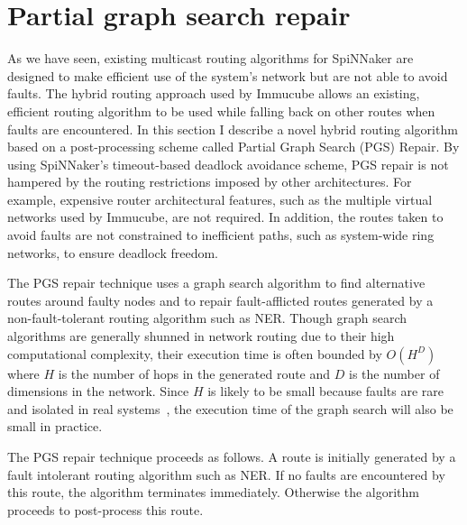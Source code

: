 	\section{Partial graph search repair}
		
		As we have seen, existing multicast routing algorithms for SpiNNaker are
		designed to make efficient use of the system's network but are not able to
		avoid faults. The hybrid routing approach used by Immucube allows an
		existing, efficient routing algorithm to be used while falling back on
		other routes when faults are encountered.  In this section I describe a
		novel hybrid routing algorithm based on a post-processing scheme called
		Partial Graph Search (PGS) Repair.  By using SpiNNaker's timeout-based
		deadlock avoidance scheme, PGS repair is not hampered by the routing
		restrictions imposed by other architectures. For example, expensive router
		architectural features, such as the multiple virtual networks used by
		Immucube, are not required. In addition, the routes taken to avoid faults
		are not constrained to inefficient paths, such as system-wide ring
		networks, to ensure deadlock freedom.
		
		The PGS repair technique uses a graph search algorithm to find alternative
		routes around faulty nodes and to repair fault-afflicted routes generated
		by a non-fault-tolerant routing algorithm such as NER. Though graph search
		algorithms are generally shunned in network routing due to their high
		computational complexity, their execution time is often bounded by $O(H^D)$
		where $H$ is the number of hops in the generated route and $D$ is the
		number of dimensions in the network.  Since $H$ is likely to be small
		because faults are rare and isolated in real
		systems~\cite{gara05,alverson12}, the execution time of the graph search
		will also be small in practice.
		
		The PGS repair technique proceeds as follows. A route is initially
		generated by a fault intolerant routing algorithm such as NER. If no faults
		are encountered by this route, the algorithm terminates immediately.
		Otherwise the algorithm proceeds to post-process this route.
		

